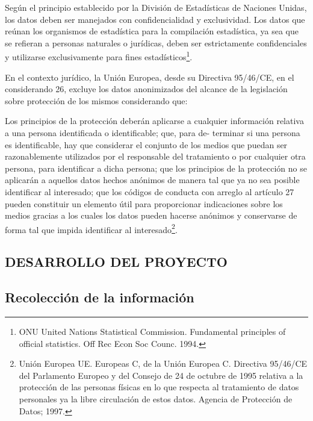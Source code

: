 \documentclass[a4paper,openright,12pt]{book}
\theoremstyle{definition}
\theoremstyle{remark}
\begin{document}
Según el principio establecido por la División de Estadísticas de Naciones Unidas, los datos deben ser manejados con confidencialidad y exclusividad.
Los datos que reúnan los organismos de estadística para la compilación estadística, ya sea que se refieran a personas naturales o jurídicas, deben ser estrictamente confidenciales y utilizarse exclusivamente para fines estadísticos\footnote{ONU United Nations Statistical Commission. Fundamental principles of official statistics. Off Rec Econ Soc Counc. 1994.}.

En el contexto jurídico, la Unión Europea, desde su Directiva 95/46/CE, en el considerando 26, excluye los datos anonimizados del alcance de la legislación sobre protección de los mismos considerando que:

Los principios de la protección deberán aplicarse a cualquier información relativa a una persona identificada o identificable; que, para de- terminar si una persona es identificable, hay que considerar el conjunto de los medios que puedan ser razonablemente utilizados por el responsable del tratamiento o por cualquier otra persona, para identificar a dicha persona; que los principios de la protección no se aplicarán a aquellos datos hechos anónimos de manera tal que ya no sea posible identificar al interesado; que los códigos de conducta con arreglo al artículo 27 pueden constituir un elemento útil para proporcionar indicaciones sobre los medios gracias a los cuales los datos pueden hacerse anónimos y conservarse de forma tal que impida identificar al interesado\footnote{Unión Europea UE. Europeas C, de la Unión Europea C. Directiva 95/46/CE del Parlamento Europeo y del Consejo de 24 de octubre de 1995 relativa a la protección de las personas físicas en lo que respecta al tratamiento de datos personales ya la libre circulación de estos datos. Agencia de Protección de Datos; 1997.}.

\begin{center}
 \chapter{DESARROLLO DEL PROYECTO}\label{cap.desarrollo}
\end{center}

\section{Recolección de la información}
\end{document}
